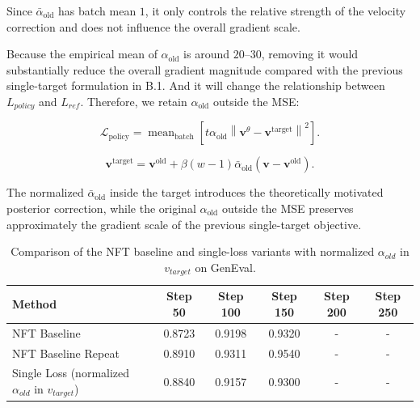 \documentclass{article} %
\begin{document}
Since $\bar{\alpha}_{\mathrm{old}}$ has batch mean $1$, it only controls the relative strength of the velocity correction and does not influence the overall gradient scale. 

Because the empirical mean of $\alpha_{\mathrm{old}}$ is around $20$--$30$, removing it would substantially reduce the overall gradient magnitude compared with the previous single-target formulation in B.1. And it will change the relationship between $L_{policy}$ and $L_{ref}$. Therefore, we retain $\alpha_{\mathrm{old}}$ outside the MSE:

\begin{equation}
\mathcal L_{\mathrm{policy}}
=
\operatorname{mean}_{\mathrm{batch}}
\left[
t\alpha_{\mathrm{old}}
\left\|
\mathbf v^\theta-\mathbf v^{\mathrm{target}}
\right\|^2
\right].
\end{equation}

\begin{equation}
\mathbf v^{\mathrm{target}}
=
\mathbf v^{\mathrm{old}}
+
\beta(w-1)
\bar{\alpha}_{\mathrm{old}}
\left(
\mathbf v-\mathbf v^{\mathrm{old}}
\right).
\end{equation}

The normalized $\bar{\alpha}_{\mathrm{old}}$ inside the target introduces the theoretically motivated posterior correction, while the original $\alpha_{\mathrm{old}}$ outside the MSE preserves approximately the gradient scale of the previous single-target objective.



\begin{table}[H]
\centering
\small
\setlength{\tabcolsep}{6pt}
\renewcommand{\arraystretch}{1.1}
\caption{
Comparison of the NFT baseline and single-loss variants with normalized $\alpha_{old}$ in $v_{target}$ on GenEval.
}
\begin{tabular}{l c c c c c}
\hline\hline
Method 
& Step 50 & Step 100 & Step 150 & Step 200 & Step 250 \\
\hline

NFT Baseline
& 0.8723 & 0.9198 & 0.9320 & - & - \\
NFT Baseline Repeat
& 0.8910 & 0.9311 & 0.9540 & - & - \\

Single Loss (normalized $\alpha_{old}$ in $v_{target}$) 
& 0.8840 & 0.9157 & 0.9300 & - & - \\
\hline\hline
\end{tabular}
\label{tab:single loss with normalied alpha}
\end{table}
\end{document}
